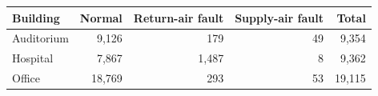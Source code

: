 \begin{tabular}{lrrrr}
\toprule
Building & Normal & Return-air fault & Supply-air fault & Total \\
\midrule
Auditorium & 9,126 & 179 & 49 & 9,354 \\
Hospital & 7,867 & 1,487 & 8 & 9,362 \\
Office & 18,769 & 293 & 53 & 19,115 \\
\bottomrule
\end{tabular}